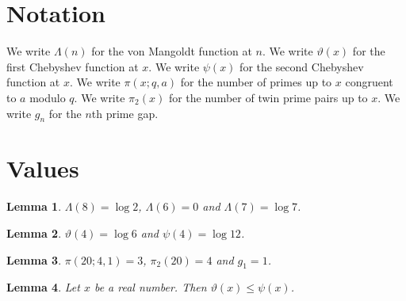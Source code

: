 \documentclass{article}
\newtheorem{lemma}{Lemma}
\begin{document}
\section{Notation}

We write $\Lambda(n)$ for the von Mangoldt function at $n$.
We write $\vartheta(x)$ for the first Chebyshev function at $x$.
We write $\psi(x)$ for the second Chebyshev function at $x$.
We write $\pi(x;q,a)$ for the number of primes up to $x$ congruent to $a$ modulo $q$.
We write $\pi_2(x)$ for the number of twin prime pairs up to $x$.
We write $g_n$ for the $n$th prime gap.

\section{Values}

\begin{lemma}\label{mangoldt}
$\Lambda(8)=\log 2$, $\Lambda(6)=0$ and $\Lambda(7)=\log 7$.
\end{lemma}

\begin{lemma}\label{chebyshev}
$\vartheta(4)=\log 6$ and $\psi(4)=\log 12$.
\end{lemma}

\begin{lemma}\label{counting}
$\pi(20;4,1)=3$, $\pi_2(20)=4$ and $g_1=1$.
\end{lemma}

\begin{lemma}\label{comparison}
Let $x$ be a real number. Then $\vartheta(x)\le\psi(x)$.
\end{lemma}
\end{document}
